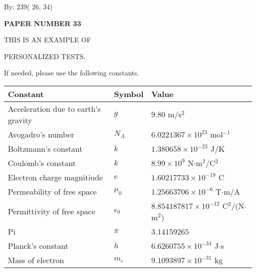 \documentclass[12pt]{article}
\begin{document}
   
\hspace{1.0in} By: 
         239(         26,          34)
   
   
   
   
\newpage 
\setcounter{page}{ 
    33001 } 
   
   
   
   
 {\textbf{ \Large{ PAPER NUMBER          33 }}}
   
   
\vspace{0.2in}
   
   
   
   
   
   
   
   
 \vspace{0.2in}
 
 
{\Huge  THIS IS AN EXAMPLE OF}
 
{\Huge  PERSONALIZED TESTS. }
 
If needed, please use the following constants.
 
 
 
\noindent\begin{tabular}{|l|l|l|}
\hline
Constant & Symbol & Value \\
\hline
Acceleration due to earth's gravity &
$g$ &
 $ 9.80 $
m/s$^2$ \\
\hline
Avogadro's number &
$N_A$ &
 $ 6.0221367 \times 10^{23} $
mol$^{-1}$ \\
\hline
Boltzmann's constant &
$k$ &
 $ 1.380658 \times 10^{-23} $
J/K \\
\hline
Coulomb's constant &
$k$ &
 $ 8.99 \times 10^{9} $
N$\cdot $m$^2$/C$^2$ \\
\hline
Electron charge magnitiude &
$e$ &
 $ 1.60217733 \times 10^{-19} $
C \\
\hline
Permeability of free space &
$\mu _0$ &
 $ 1.25663706 \times 10^{-6} $
T$\cdot $m/A \\
\hline
Permittivity of free space &
$\epsilon _0$ &
 $ 8.854187817 \times 10^{-12} $
C$^2$/(N$\cdot $m$^2$) \\
\hline
Pi &
$\pi$ &
 $ 3.14159265 $
$ $ \\
\hline
Planck's constant &
$h$ &
 $ 6.6260755 \times 10^{-34} $
J$\cdot $s \\
\hline
Mass of electron &
$m_e$ &
 $ 9.1093897 \times 10^{-31} $
kg \\
\hline
\end{tabular}
 
\end{document}
